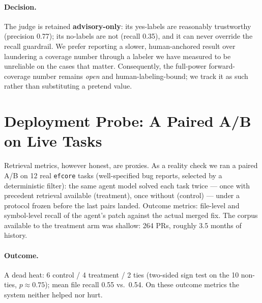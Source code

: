 \documentclass[sigconf,nonacm]{acmart}
\begin{document}
\paragraph{Decision.}
The judge is retained \textbf{advisory-only}: its yes-labels are reasonably
trustworthy (precision 0.77); its no-labels are not (recall 0.35), and it
can never override the recall guardrail. We prefer reporting a slower,
human-anchored result over laundering a coverage number through a labeler
we have measured to be unreliable on the cases that matter. Consequently,
the full-power forward-coverage number remains \emph{open} and
human-labeling-bound; we track it as such rather than substituting a
pretend value.

\section{Deployment Probe: A Paired A/B on Live Tasks}
\label{sec:ab}

Retrieval metrics, however honest, are proxies. As a reality check we ran
a paired A/B on 12 real \texttt{efcore} tasks (well-specified bug reports,
selected by a deterministic filter): the same agent model solved each task
twice --- once with precedent retrieval available (treatment), once
without (control) --- under a protocol frozen before the last pairs
landed. Outcome metrics: file-level and symbol-level recall of the
agent's patch against the actual merged fix. The corpus available to the
treatment arm was shallow: 264 PRs, roughly 3.5 months of history.

\paragraph{Outcome.}
A dead heat: 6 control / 4 treatment / 2 ties (two-sided sign test on the
10 non-ties, $p \approx 0.75$); mean file recall 0.55 vs.\ 0.54. On these
outcome metrics the system neither helped nor hurt.
\end{document}
